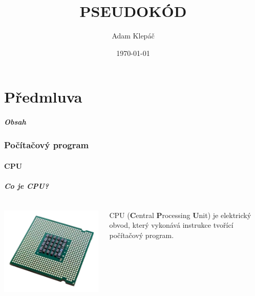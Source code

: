 \documentclass[aspectratio=169,11pt]{beamer}
\title{PSEUDOKÓD}
\date{\today}
\author{Adam Klepáč}
\institute[GEVO]{Gymnázium Evolution Jižní Město}
\begin{document}
\maketitle

\part[Předmluva]{Předmluva}

\begin{frame}
 \partpage
\end{frame}

\begin{frame}
 \frametitle{Obsah}
 \tableofcontents
\end{frame}

\section[Program]{Počítačový program}
\subsection[CPU]{CPU}

\begin{frame}
 \frametitle{Co je CPU?}
 \begin{columns}
  \begin{column}{.3\textwidth}
   \includegraphics[width=\textwidth]{cpu}
  \end{column}
  \begin{column}{.7\textwidth}
   \begin{tcolorbox}
    CPU (\textbf{C}entral \textbf{P}rocessing \textbf{U}nit) je elektrický
    obvod, který vykonává \alert{instrukce} tvořící \alert{počítačový program}.
   \end{tcolorbox}
  \end{column}
 \end{columns}
\end{frame}
\end{document}
